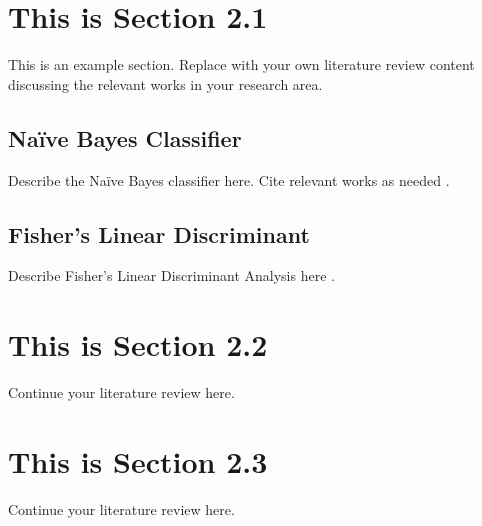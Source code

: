 \section{This is Section 2.1}
\label{sec:section21}

This is an example section. Replace with your own literature review
content discussing the relevant works in your research area.

\subsection{Na\"{i}ve Bayes Classifier}
\label{subsec:naivebayes}

Describe the Naïve Bayes classifier here. Cite relevant works as
needed \cite{serneels2005}.

\subsection{Fisher's Linear Discriminant}
\label{subsec:fisherlda}

Describe Fisher's Linear Discriminant Analysis here \cite{fort2005}.

\section{This is Section 2.2}
\label{sec:section22}

Continue your literature review here.

\section{This is Section 2.3}
\label{sec:section23}

Continue your literature review here.
